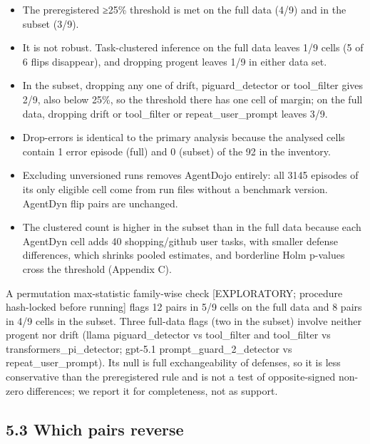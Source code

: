 \documentclass[10pt]{article}
\providecommand{\tightlist}{\setlength{\itemsep}{0pt}\setlength{\parskip}{0pt}}
\begin{document}
\begin{itemize}
\tightlist
\item
  The preregistered ≥25\% threshold is met on the full data (4/9) and in the subset (3/9).
\item
  It is not robust. Task-clustered inference on the full data leaves 1/9 cells (5 of 6 flips disappear), and dropping progent leaves 1/9 in either data set.
\item
  In the subset, dropping any one of drift, piguard\_detector or tool\_filter gives 2/9, also below 25\%, so the threshold there has one cell of margin; on the full data, dropping drift or tool\_filter or repeat\_user\_prompt leaves 3/9.
\item
  Drop-errors is identical to the primary analysis because the analysed cells contain 1 error episode (full) and 0 (subset) of the 92 in the inventory.
\item
  Excluding unversioned runs removes AgentDojo entirely: all 3145 episodes of its only eligible cell come from run files without a benchmark version. AgentDyn flip pairs are unchanged.
\item
  The clustered count is higher in the subset than in the full data because each AgentDyn cell adds 40 shopping/github user tasks, with smaller defense differences, which shrinks pooled estimates, and borderline Holm p-values cross the threshold (Appendix C).
\end{itemize}

A permutation max-statistic family-wise check {[}EXPLORATORY; procedure hash-locked before running{]} flags 12 pairs in 5/9 cells on the full data and 8 pairs in 4/9 cells in the subset. Three full-data flags (two in the subset) involve neither progent nor drift (llama piguard\_detector vs tool\_filter and tool\_filter vs transformers\_pi\_detector; gpt-5.1 prompt\_guard\_2\_detector vs repeat\_user\_prompt). Its null is full exchangeability of defenses, so it is less conservative than the preregistered rule and is not a test of opposite-signed non-zero differences; we report it for completeness, not as support.

\subsection{5.3 Which pairs reverse}\label{which-pairs-reverse}
\end{document}
